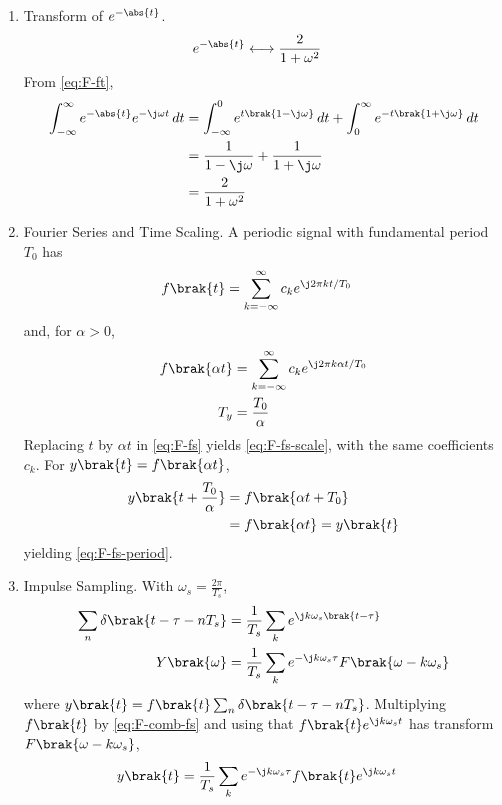 \begin{enumerate}[label=\thesubsection.\arabic*, ref=\thesubsection.\theenumi]
\item Transform of $e^{-\abs{t}}$.
\begin{align}
e^{-\abs{t}} &\longleftrightarrow \frac{2}{1 + \omega^2}
\label{eq:F-ft-pair}
\end{align}
\solution From \eqref{eq:F-ft},
\begin{align}
\int_{-\infty}^{\infty} e^{-\abs{t}} e^{-\j \omega t} \,dt &= \int_{-\infty}^{0} e^{t\brak{1 - \j \omega}} \,dt + \int_{0}^{\infty} e^{-t\brak{1 + \j \omega}} \,dt
\\
&= \frac{1}{1 - \j \omega} + \frac{1}{1 + \j \omega}
\\
&= \frac{2}{1 + \omega^2}
\end{align}
\item Fourier Series and Time Scaling. A periodic signal with fundamental period $T_0$ has
\begin{align}
f\brak{t} &= \sum_{k = -\infty}^{\infty} c_k e^{\j 2\pi k t / T_0}
\label{eq:F-fs}
\end{align}
and, for $\alpha > 0$,
\begin{align}
f\brak{\alpha t} &= \sum_{k = -\infty}^{\infty} c_k e^{\j 2\pi k \alpha t / T_0}
\label{eq:F-fs-scale}
\\
T_y &= \frac{T_0}{\alpha}
\label{eq:F-fs-period}
\end{align}
\solution Replacing $t$ by $\alpha t$ in \eqref{eq:F-fs} yields \eqref{eq:F-fs-scale}, with the same coefficients $c_k$. For $y\brak{t} = f\brak{\alpha t}$,
\begin{align}
y\brak{t + \frac{T_0}{\alpha}} &= f\brak{\alpha t + T_0}
\\
&= f\brak{\alpha t} = y\brak{t}
\end{align}
yielding \eqref{eq:F-fs-period}.
\item Impulse Sampling. With $\omega_s = \frac{2\pi}{T_s}$,
\begin{align}
\sum_{n} \delta\brak{t - \tau - n T_s} &= \frac{1}{T_s} \sum_{k} e^{\j k \omega_s \brak{t - \tau}}
\label{eq:F-comb-fs}
\\
Y\brak{\omega} &= \frac{1}{T_s} \sum_{k} e^{-\j k \omega_s \tau} F\brak{\omega - k \omega_s}
\label{eq:F-sampled}
\end{align}
where $y\brak{t} = f\brak{t} \sum_{n} \delta\brak{t - \tau - n T_s}$.
\solution Multiplying $f\brak{t}$ by \eqref{eq:F-comb-fs} and using that $f\brak{t}e^{\j k \omega_s t}$ has transform $F\brak{\omega - k\omega_s}$,
\begin{align}
y\brak{t} &= \frac{1}{T_s} \sum_{k} e^{-\j k \omega_s \tau} f\brak{t} e^{\j k \omega_s t}

\end{align}
\end{enumerate}
